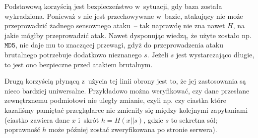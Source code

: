 Podstawową korzyścią jest bezpieczeństwo w~sytuacji, gdy baza została
wykradziona. Ponieważ $s$ nie jest przechowywane w~bazie, atakujący nie może
przeprowadzić żadnego sensownego ataku~-- tak naprawdę nie zna nawet $H$, na
jakie mógłby przeprowadzić atak. Nawet dysponując wiedzą, że użyte zostało np.
$\texttt{MD5}$, nie daje mu to znaczącej przewagi, gdyż do przeprowadzenia
ataku brutalnego potrzebuje dodatkowo nieznanego $s$. Jeżeli $s$ jest
wystarczająco długie, to jest ono bezpieczne przed atakiem brutalnym.

Drugą korzyścią płynącą z~użycia tej linii obrony jest to, że jej zastosowania
są nieco bardziej uniwersalne. Przykładowo można weryfikować, czy dane
przesłane zewnętrznemu podmiotowi nie uległy zmianie, czyli np. czy ciastka
które kazaliśmy pamiętać przeglądarce nie zmieniły się między kolejnymi
zapytaniami (ciastko zawiera dane $x$ i~skrót $h = H(x||s)$, gdzie $s$ to
sekretna sól; poprawność $h$ może później zostać zweryfikowana po stronie
serwera).

